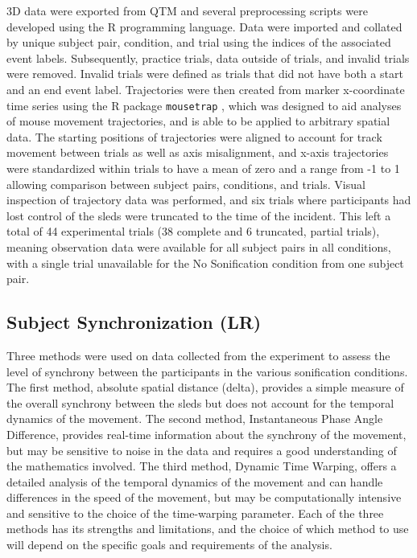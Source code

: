 \documentclass[10pt,a4paper,onecolumn]{article}
\begin{document}
3D data were exported from QTM and several preprocessing scripts were developed using the R programming language. Data were imported and collated by unique subject pair, condition, and trial using the indices of the associated event labels. Subsequently, practice trials, data outside of trials, and invalid trials were removed. Invalid trials were defined as trials that did not have both a start and an end event label. Trajectories were then created from marker x-coordinate time series using the R package \texttt{mousetrap} \autocite{mousetrap2021}, which was designed to aid analyses of mouse movement trajectories, and is able to be applied to arbitrary spatial data. The starting positions of trajectories were aligned to account for track movement between trials as well as axis misalignment, and x-axis trajectories were standardized within trials to have a mean of zero and a range from -1 to 1 allowing comparison between subject pairs, conditions, and trials. Visual inspection of trajectory data was performed, and six trials where participants had lost control of the sleds were truncated to the time of the incident. This left a total of 44 experimental trials (38 complete and 6 truncated, partial trials), meaning observation data were available for all subject pairs in all conditions, with a single trial unavailable for the No Sonification condition from one subject pair.

\hypertarget{subject-synchronization-lr}{%
\subsection{Subject Synchronization (LR)}\label{subject-synchronization-lr}}

Three methods were used on data collected from the experiment to assess the level of synchrony between the participants in the various sonification conditions. The first method, absolute spatial distance (delta), provides a simple measure of the overall synchrony between the sleds but does not account for the temporal dynamics of the movement. The second method, Instantaneous Phase Angle Difference, provides real-time information about the synchrony of the movement, but may be sensitive to noise in the data and requires a good understanding of the mathematics involved. The third method, Dynamic Time Warping, offers a detailed analysis of the temporal dynamics of the movement and can handle differences in the speed of the movement, but may be computationally intensive and sensitive to the choice of the time-warping parameter. Each of the three methods has its strengths and limitations, and the choice of which method to use will depend on the specific goals and requirements of the analysis.
\end{document}
